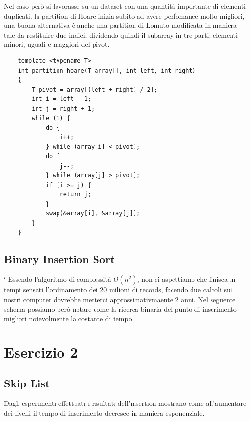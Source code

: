 \documentclass[letterpaper]{report}
\begin{document}
Nel caso però si lavorasse su un dataset con una quantità importante di elementi
duplicati, la partition di Hoare inizia subito ad avere perfomance molto migliori,
una buona alternativa è anche una partition di Lomuto modificata in maniera tale
da restituire due indici, dividendo quindi il subarray in tre parti:
elementi minori, uguali e maggiori del pivot.

\begin{lstlisting}
    template <typename T>
    int partition_hoare(T array[], int left, int right)
    {
        T pivot = array[(left + right) / 2];
        int i = left - 1;
        int j = right + 1;
        while (1) {
            do {
                i++;
            } while (array[i] < pivot);
            do {
                j--;
            } while (array[j] > pivot);
            if (i >= j) {
                return j;
            }
            swap(&array[i], &array[j]);
        }
    }
\end{lstlisting}

\newpage
\section{Binary Insertion Sort}`
Essendo l'algoritmo di complessità $O(n^2)$, non ci aspettiamo che finisca in tempi
sensati l'ordinamento dei 20 milioni di records, facendo due calcoli sui nostri computer
dovrebbe metterci approssimativmaente 2 anni.
Nel seguente schema possiamo però notare come la ricerca binaria del punto di inserimento
migliori notevolmente la costante di tempo.
\begin{figure}[H]
\centering
    
\end{figure}

\chapter*{Esercizio 2}

\section{Skip List}
Dagli esperimenti effettuati i risultati dell'insertion mostrano come 
all'aumentare dei livelli il tempo di inserimento decresce in maniera esponenziale.
\begin{figure}[H]
\centering
    
\end{figure}
\end{document}
